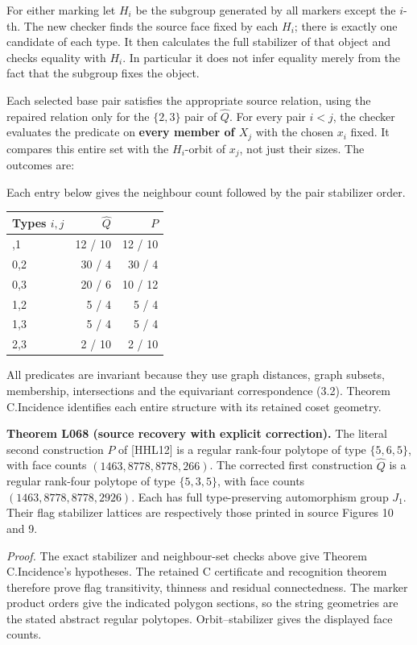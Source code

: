 For either marking let \(H_i\) be the subgroup generated by all markers
except the \(i\)-th. The new checker finds the source face fixed by each
\(H_i\); there is exactly one candidate of each type. It then calculates
the full stabilizer of that object and checks equality with \(H_i\). In
particular it does not infer equality merely from the fact that the
subgroup fixes the object.

Each selected base pair satisfies the appropriate source relation, using
the repaired relation only for the \(\{2,3\}\) pair of \(\widehat Q\).
For every pair \(i<j\), the checker evaluates the predicate on
\textbf{every member of \(X_j\)} with the chosen \(x_i\) fixed. It
compares this entire set with the \(H_i\)-orbit of \(x_j\), not just
their sizes. The outcomes are:

Each entry below gives the neighbour count followed by the pair
stabilizer order.

{\def\LTcaptype{none} %
\begin{longtable}[]{@{}lrr@{}}
\toprule\noalign{}
Types \(i,j\) & \(\widehat Q\) & \(P\) \\
\midrule\noalign{}
\endhead
\bottomrule\noalign{}
\endlastfoot
0,1 & 12 / 10 & 12 / 10 \\
0,2 & 30 / 4 & 30 / 4 \\
0,3 & 20 / 6 & 10 / 12 \\
1,2 & 5 / 4 & 5 / 4 \\
1,3 & 5 / 4 & 5 / 4 \\
2,3 & 2 / 10 & 2 / 10 \\
\end{longtable}
}

All predicates are invariant because they use graph distances, graph
subsets, membership, intersections and the equivariant correspondence
(3.2). Theorem C.Incidence identifies each entire structure with its retained
coset geometry.

\textbf{Theorem L068 (source recovery with explicit correction).} The
literal second construction \(P\) of {[}HHL12{]} is a regular rank-four
polytope of type \(\{5,6,5\}\), with face counts
\((1463,8778,8778,266)\). The corrected first construction
\(\widehat Q\) is a regular rank-four polytope of type \(\{5,3,5\}\),
with face counts \((1463,8778,8778,2926)\). Each has full
type-preserving automorphism group \(J_1\). Their flag stabilizer
lattices are respectively those printed in source Figures 10 and 9.

\emph{Proof.} The exact stabilizer and neighbour-set checks above give
Theorem C.Incidence's hypotheses. The retained C certificate and recognition
theorem therefore prove flag transitivity, thinness and residual
connectedness. The marker product orders give the indicated polygon
sections, so the string geometries are the stated abstract regular
polytopes. Orbit--stabilizer gives the displayed face counts.

